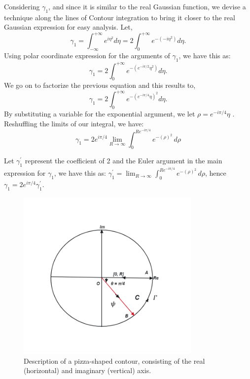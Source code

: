 \documentclass{article}
\begin{document}
Considering $\gamma_{1}$, and since it is similar to the real Gaussian function, we devise a technique along the lines of Contour integration to bring it closer to the real Gaussian expression for easy analysis. Let,
\begin{equation}
    \gamma_{1} = \int_{-\infty}^{+ \infty}e^{i\eta^{2}}d\eta = 2\int_{0}^{+ \infty}e^{-(-i\eta^{2})}d\eta.
\end{equation}
Using polar coordinate expression for the arguments of $\gamma_{1}$, we have this as:
\begin{equation}
    \gamma_{1} = 2\int_{0}^{+ \infty}e^{-(e^{-i\pi/2} \eta^{2})}d\eta.
\end{equation}
We go on to factorize the previous equation and this results to, 
\begin{equation}
    \gamma_{1} = 2\int_{0}^{+ \infty}e^{-(e^{-i\pi/4} \eta)^{2}}d\eta.
\end{equation}
By substituting a variable for the exponential argument, we let $\rho = e^{-i\pi/4} \eta$ \cite{video}. Reshuffling the limits of our integral, we have: 
\begin{equation}
    \gamma_{1} = 2 e^{i\pi/4} \lim_{{R \to \infty}} \int_{0}^{Re^{-i\pi/4}} e^{-(\rho)^{2}} \, d\rho
\end{equation}

Let $\gamma_{1}^{'}$ represent the coefficient of 2 and the Euler argument in the main expression for $\gamma_{1}$, we have this as: $\gamma_{1}^{'} = \lim_{{R \to \infty}} \int_{0}^{Re^{-i\pi/4}} e^{-(\rho)^{2}} \, d\rho$, hence $\gamma_{1} = 2 e^{i\pi/4} \gamma_{1}^{'}$.

\begin{figure}[h] 
\centering
\includegraphics[width=0.8\textwidth]{COUNTOUR_INTEGRATION_DIAGRAM.png}
\caption{ Description of a pizza-shaped contour, consisting of the real (horizontal) and imaginary (vertical) axis.} \label{fig:my_label}
\end{figure}
\end{document}
